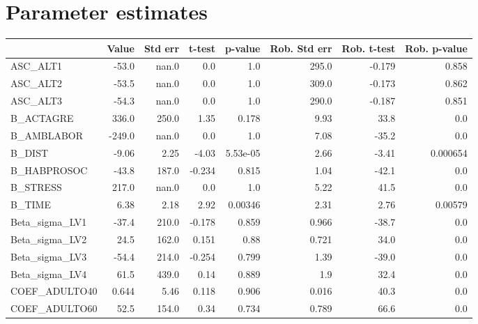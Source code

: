 \section{Parameter estimates}
\begin{tabular}{lrrrrrrr}
\toprule
{} &  Value &  Std err &  t-test &  p-value &  Rob. Std err &  Rob. t-test &  Rob. p-value \\
\midrule
ASC\_ALT1         &  -53.0 &    nan.0 &     0.0 &      1.0 &         295.0 &       -0.179 &         0.858 \\
ASC\_ALT2         &  -53.5 &    nan.0 &     0.0 &      1.0 &         309.0 &       -0.173 &         0.862 \\
ASC\_ALT3         &  -54.3 &    nan.0 &     0.0 &      1.0 &         290.0 &       -0.187 &         0.851 \\
B\_ACTAGRE        &  336.0 &    250.0 &    1.35 &    0.178 &          9.93 &         33.8 &           0.0 \\
B\_AMBLABOR       & -249.0 &    nan.0 &     0.0 &      1.0 &          7.08 &        -35.2 &           0.0 \\
B\_DIST           &  -9.06 &     2.25 &   -4.03 & 5.53e-05 &          2.66 &        -3.41 &      0.000654 \\
B\_HABPROSOC      &  -43.8 &    187.0 &  -0.234 &    0.815 &          1.04 &        -42.1 &           0.0 \\
B\_STRESS         &  217.0 &    nan.0 &     0.0 &      1.0 &          5.22 &         41.5 &           0.0 \\
B\_TIME           &   6.38 &     2.18 &    2.92 &  0.00346 &          2.31 &         2.76 &       0.00579 \\
Beta\_sigma\_LV1   &  -37.4 &    210.0 &  -0.178 &    0.859 &         0.966 &        -38.7 &           0.0 \\
Beta\_sigma\_LV2   &   24.5 &    162.0 &   0.151 &     0.88 &         0.721 &         34.0 &           0.0 \\
Beta\_sigma\_LV3   &  -54.4 &    214.0 &  -0.254 &    0.799 &          1.39 &        -39.0 &           0.0 \\
Beta\_sigma\_LV4   &   61.5 &    439.0 &    0.14 &    0.889 &           1.9 &         32.4 &           0.0 \\
COEF\_ADULTO40    &  0.644 &     5.46 &   0.118 &    0.906 &         0.016 &         40.3 &           0.0 \\
COEF\_ADULTO60    &   52.5 &    154.0 &    0.34 &    0.734 &         0.789 &         66.6 &           0.0 \\

\end{tabular}
